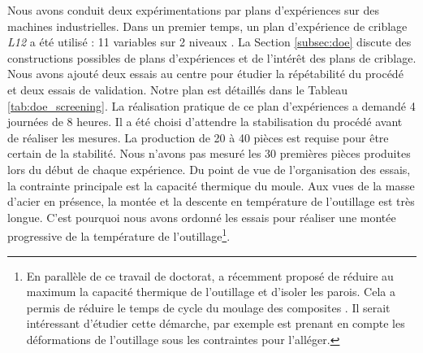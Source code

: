 Nous avons conduit deux expérimentations par plans d'expériences sur des machines industrielles.
Dans un premier temps, un plan d'expérience de criblage \textit{L12} a été utilisé : 11 variables sur 2 niveaux \cite{plackett_design_1946}.
La Section \ref{subsec:doe} discute des constructions possibles de plans d'expériences et de l'intérêt des plans de criblage.
Nous avons ajouté deux essais au centre pour étudier la répétabilité du procédé et deux essais de validation.
Notre plan est détaillés dans le Tableau \ref{tab:doe_screening}.
La réalisation pratique de ce plan d'expériences a demandé 4 journées de 8 heures.
Il a été choisi d'attendre la stabilisation du procédé avant de réaliser les mesures.
La production de 20 à 40 pièces est requise pour être certain de la stabilité.
Nous n'avons pas mesuré les 30 premières pièces produites lors du début de chaque expérience.
Du point de vue de l'organisation des essais, la contrainte principale est la capacité thermique du moule.
Aux vues de la masse d'acier en présence, la montée et la descente en température de l'outillage est très longue.
C'est pourquoi nous avons ordonné les essais pour réaliser une montée progressive de la température de l'outillage\footnote{En parallèle de ce travail de doctorat, \citeauthor{collomb_2018} a récemment proposé de réduire au maximum la capacité thermique de l'outillage et d'isoler les parois. Cela a permis de réduire le temps de cycle du moulage des composites \cite{collomb_2018}.
Il serait intéressant d'étudier cette démarche, par exemple est prenant en compte les déformations de l'outillage sous les contraintes pour l'alléger.}.

\makeatletter
\newcommand*{\yncellcolor}{}
\def\yncellcolor\ignorespaces{}
\newcolumntype{m}{>{\yncellcolor}c}
\makeatother

